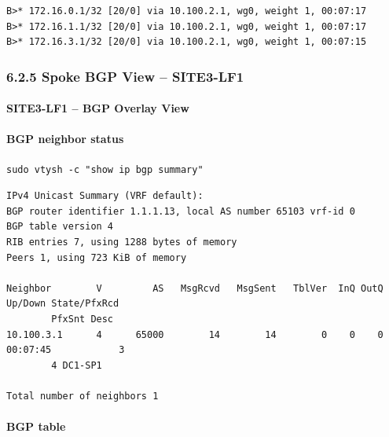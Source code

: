 \documentclass[11pt]{article}
\begin{document}
\begin{verbatim}
B>* 172.16.0.1/32 [20/0] via 10.100.2.1, wg0, weight 1, 00:07:17
B>* 172.16.1.1/32 [20/0] via 10.100.2.1, wg0, weight 1, 00:07:17
B>* 172.16.3.1/32 [20/0] via 10.100.2.1, wg0, weight 1, 00:07:15
\end{verbatim}

%
%
%
\subsubsection{6.2.5 Spoke BGP View -- SITE3-LF1}
\label{sec:bgp-overlay-spoke-site3}

\paragraph{SITE3-LF1 -- BGP Overlay View}

\paragraph{BGP neighbor status}

\begin{verbatim}
sudo vtysh -c "show ip bgp summary"
\end{verbatim}

\begin{verbatim}
IPv4 Unicast Summary (VRF default):
BGP router identifier 1.1.1.13, local AS number 65103 vrf-id 0
BGP table version 4
RIB entries 7, using 1288 bytes of memory
Peers 1, using 723 KiB of memory

Neighbor        V         AS   MsgRcvd   MsgSent   TblVer  InQ OutQ  Up/Down State/PfxRcd
        PfxSnt Desc
10.100.3.1      4      65000        14        14        0    0    0 00:07:45            3
        4 DC1-SP1

Total number of neighbors 1
\end{verbatim}

\paragraph{BGP table}
\end{document}
